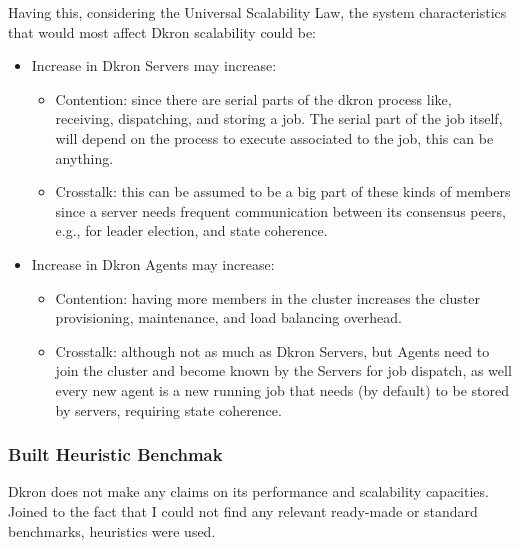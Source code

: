 \documentclass[runningheads]{llncs}
\begin{document}
Having this, considering the Universal Scalability Law, the system characteristics that would most
affect Dkron scalability could be:

\begin{itemize}
    \item Increase in Dkron Servers may increase:
     \begin{itemize}
        \item Contention: since there are serial parts of the dkron process like,
        receiving, dispatching, and storing a job. The serial part of the job itself, will
        depend on the process to execute associated to the job, this can be anything.
        \item Crosstalk: this can be assumed to be a big part of these kinds of members since
        a server needs frequent communication between its consensus peers, e.g., for
        leader election, and state coherence.
     \end{itemize}
    \item Increase in Dkron Agents may increase:
     \begin{itemize}
        \item Contention: having more members in the cluster increases the cluster provisioning, maintenance,
     and load balancing overhead.
        \item Crosstalk: although not as much as Dkron Servers, but Agents need to join the cluster and become
     known by the Servers for job dispatch, as well every new agent is a new running job that needs (by default)
     to be stored by servers, requiring state coherence.
     \end{itemize}
\end{itemize}



\subsubsection{Built Heuristic Benchmak}

Dkron does not make any claims on its performance and scalability capacities. Joined to the fact that
I could not find any relevant ready-made or standard benchmarks, heuristics were used.
\end{document}
